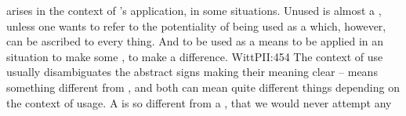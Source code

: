 \pa {} arises in the context of 's application, in some
 situations.  Unused  is almost a , unless one wants to refer to the potentiality of being used as a
 which, however, can be ascribed to every thing.  And to be used as a
 means to be applied in an  situation to make some
, to make a difference. \citet{The arrow points only in the
  application that a living being makes of it.}{WittPI}{I:454} The context of
use
usually disambiguates the abstract signs making their meaning clear --
  means something different from , and both can mean
quite different things depending on the context of usage. A  is
so different from a , that we would never attempt any
